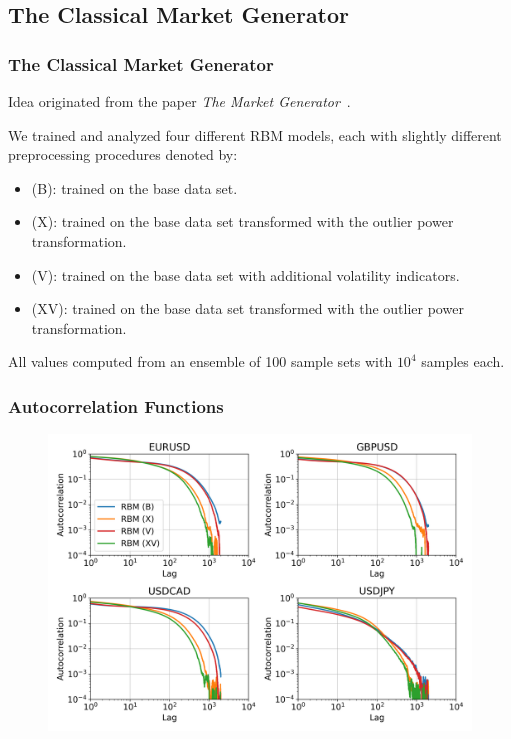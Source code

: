\documentclass{beamer}
\begin{document}
\subsection{The Classical Market Generator}
\begin{frame}
    \frametitle{The Classical Market Generator}
    Idea originated from the paper \textit{The Market Generator}~\cite{kondratyev_2019}.

    We trained and analyzed four different RBM models, each with slightly different preprocessing procedures denoted by:
    \begin{itemize}
        \item (B): trained on the base data set.
        \item (X): trained on the base data set transformed with the outlier power transformation.
        \item (V): trained on the base data set with additional volatility indicators.
        \item (XV): trained on the base data set transformed with the outlier power transformation.
    \end{itemize}
    All values computed from an ensemble of 100 sample sets with \( 10^4 \) samples each.
\end{frame}

\begin{frame}
    \frametitle{Autocorrelation Functions}
    \begin{figure}
        \includegraphics[width=0.9\linewidth]{rbm/autocorrelation_functions.png}
    \end{figure}
\end{frame}
\end{document}
